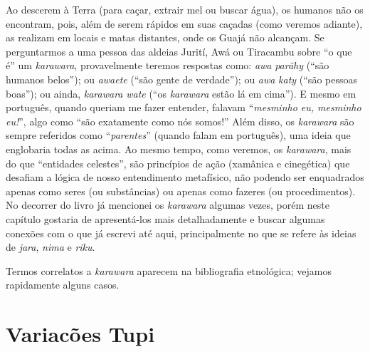 Ao descerem à Terra (para caçar, extrair mel ou buscar água), os humanos
não os encontram, pois, além de serem rápidos em suas caçadas (como
veremos adiante), as realizam em locais e matas distantes, onde os Guajá
não alcançam. Se perguntarmos a uma pessoa das aldeias Jurití, Awá ou
Tiracambu sobre ``o que é'' um \emph{karawara}, provavelmente teremos
respostas como: \emph{awa} \emph{parãhy} (``são humanos belos''); ou
\emph{awaete} (``são gente de verdade''); ou \emph{awa} \emph{katy} (``são
pessoas boas''); ou ainda, \emph{karawara} \emph{wate} (``os
\emph{karawara} estão lá em cima''). E mesmo em português, quando queriam
me fazer entender, falavam ``\emph{mesminho eu, mesminho eu!}'', algo como
``são exatamente como nós somos!'' Além disso, os \emph{karawara} são
sempre referidos como ``\emph{parentes}'' (quando falam em português), uma
ideia que englobaria todas as acima. Ao mesmo tempo, como veremos, os
\emph{karawara}, mais do que ``entidades celestes'', são princípios de
ação (xamânica e cinegética) que desafiam a lógica de nosso entendimento
metafísico, não podendo ser enquadrados apenas como seres (ou
substâncias) ou apenas como fazeres (ou procedimentos). No decorrer do
livro já mencionei os \emph{karawara} algumas vezes, porém neste
capítulo gostaria de apresentá-los mais detalhadamente e buscar algumas
conexões com o que já escrevi até aqui, principalmente no que se refere
às ideias de \emph{jara}, \emph{nima} e \emph{riku}.

Termos correlatos a \emph{karawara} aparecem na bibliografia etnológica;
vejamos rapidamente alguns casos.

\section{Variacões Tupi}\label{variacuxf5es-tupi}

